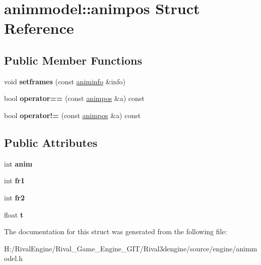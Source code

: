 \hypertarget{structanimmodel_1_1animpos}{}\section{animmodel\+:\+:animpos Struct Reference}
\label{structanimmodel_1_1animpos}
\subsection*{Public Member Functions}
\begin{DoxyCompactItemize}
\item 
\mbox{\label{structanimmodel_1_1animpos_aa5723e46e6e5f17e9d2eb978bdec8cfd}} 
void {\bfseries setframes} (const \hyperlink{structaniminfo}{animinfo} \&info)
\item 
\mbox{\label{structanimmodel_1_1animpos_ae5fd4719d19503408a7c8a10c3cc516c}} 
bool {\bfseries operator==} (const \hyperlink{structanimmodel_1_1animpos}{animpos} \&a) const
\item 
\mbox{\label{structanimmodel_1_1animpos_a251861f2551eb5cd53544cb362c01e3a}} 
bool {\bfseries operator!=} (const \hyperlink{structanimmodel_1_1animpos}{animpos} \&a) const
\end{DoxyCompactItemize}
\subsection*{Public Attributes}
\begin{DoxyCompactItemize}
\item 
\mbox{\label{structanimmodel_1_1animpos_a740becfa376f8c7f03065e4815cfb1b3}} 
int {\bfseries anim}
\item 
\mbox{\label{structanimmodel_1_1animpos_a188a93230cec192000d2a49113a2afdc}} 
int {\bfseries fr1}
\item 
\mbox{\label{structanimmodel_1_1animpos_ae796f792d1983ee48d0182d63057ef6c}} 
int {\bfseries fr2}
\item 
\mbox{\label{structanimmodel_1_1animpos_ae7340830bcb39bbea5c95ee9059fcd8d}} 
float {\bfseries t}
\end{DoxyCompactItemize}


The documentation for this struct was generated from the following file\+:\begin{DoxyCompactItemize}
\item 
H\+:/\+Rival\+Engine/\+Rival\+\_\+\+Game\+\_\+\+Engine\+\_\+\+G\+I\+T/\+Rival3dengine/source/engine/animmodel.\+h\end{DoxyCompactItemize}

